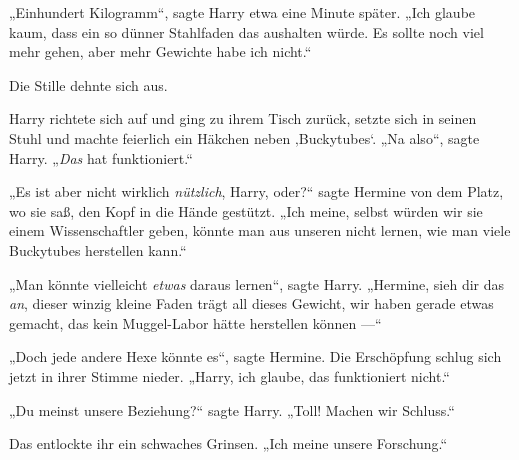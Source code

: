 „Einhundert Kilogramm“, sagte Harry etwa eine Minute später.
„Ich glaube kaum, dass ein so dünner Stahlfaden das aushalten würde. Es sollte noch viel mehr gehen, aber mehr Gewichte habe ich nicht.“

Die Stille dehnte sich aus.

Harry richtete sich auf und ging zu ihrem Tisch zurück, setzte sich in seinen Stuhl und machte feierlich ein Häkchen neben ‚Buckytubes‘.
„Na also“, sagte Harry.
„\emph{Das} hat funktioniert.“

„Es ist aber nicht wirklich \emph{nützlich}, Harry, oder?“ sagte Hermine von dem Platz, wo sie saß, den Kopf in die Hände gestützt.
„Ich meine, selbst würden wir sie einem Wissenschaftler geben, könnte man aus unseren nicht lernen, wie man viele Buckytubes herstellen kann.“

„Man könnte vielleicht \emph{etwas} daraus lernen“, sagte Harry.
„Hermine, sieh dir das \emph{an}, dieser winzig kleine Faden trägt all dieses Gewicht, wir haben gerade etwas gemacht, das kein Muggel-Labor hätte herstellen können —“

„Doch jede andere Hexe könnte es“, sagte Hermine. Die Erschöpfung schlug sich jetzt in ihrer Stimme nieder.
„Harry, ich glaube, das funktioniert nicht.“

„Du meinst unsere Beziehung?“ sagte Harry.
„Toll! Machen wir Schluss.“

Das entlockte ihr ein schwaches Grinsen.
„Ich meine unsere Forschung.“

